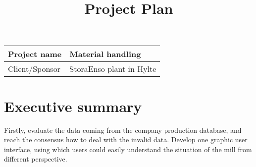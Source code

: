 \documentclass{report}
\begin{document}
 
\title{Project Plan} 
\maketitle 

\begin{table}[h]
\begin{tabular}{| l | l |}
	\hline
	Project name & Material handling \\
	\hline
	Client/Sponsor & StoraEnso plant in Hylte \\
	\hline
\end{tabular}
\end{table} 

\section{Executive summary}
Firstly, evaluate the data coming from the company production database, and reach the consensus how to deal with the invalid data. Develop one graphic 
user interface, using which users could easily understand the situation of the mill from different perspective.
\end{document}
